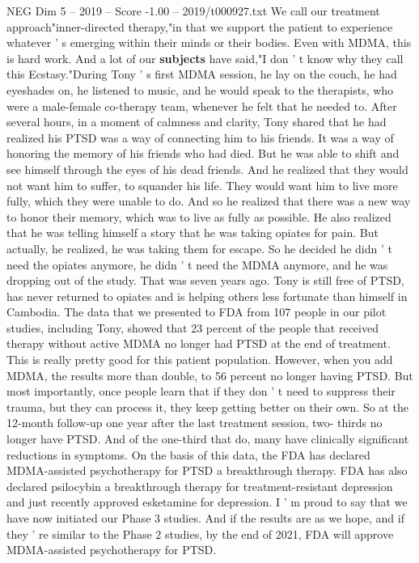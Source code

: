 \begin{textsample}{NEG Dim 5 – 2019 – Score -1.00 – 2019/t000927.txt}
We call our treatment approach"inner-directed therapy,"in that we support the patient to experience whatever ' s emerging within their minds or their bodies.
Even with MDMA, this is hard work.
And a lot of our \textbf{subjects} have said,"I don ' t know why they call this Ecstasy."During Tony ' s first MDMA session, he lay on the couch, he had eyeshades on, he listened to music, and he would speak to the therapists, who were a male-female co-therapy team, whenever he felt that he needed to.
After several hours, in a moment of calmness and clarity, Tony shared that he had realized his PTSD was a way of connecting him to his friends.
It was a way of honoring the memory of his friends who had died.
But he was able to shift and see himself through the eyes of his dead friends.
And he realized that they would not want him to suffer, to squander his life.
They would want him to live more fully, which they were unable to do.
And so he realized that there was a new way to honor their memory, which was to live as fully as possible.
He also realized that he was telling himself a story that he was taking opiates for pain.
But actually, he realized, he was taking them for escape.
So he decided he didn ' t need the opiates anymore, he didn ' t need the MDMA anymore, and he was dropping out of the study.
That was seven years ago.
Tony is still free of PTSD, has never returned to opiates and is helping others less fortunate than himself in Cambodia.
The data that we presented to FDA from 107 people in our pilot studies, including Tony, showed that 23 percent of the people that received therapy without active MDMA no longer had PTSD at the end of treatment.
This is really pretty good for this patient population.
However, when you add MDMA, the results more than double, to 56 percent no longer having PTSD.
But most importantly, once people learn that if they don ' t need to suppress their trauma, but they can process it, they keep getting better on their own.
So at the 12-month follow-up one year after the last treatment session, two- thirds no longer have PTSD.
And of the one-third that do, many have clinically significant reductions in symptoms.
On the basis of this data, the FDA has declared MDMA-assisted psychotherapy for PTSD a breakthrough therapy.
FDA has also declared psilocybin a breakthrough therapy for treatment-resistant depression and just recently approved esketamine for depression.
I ' m proud to say that we have now initiated our Phase 3 studies.
And if the results are as we hope, and if they ' re similar to the Phase 2 studies, by the end of 2021, FDA will approve MDMA-assisted psychotherapy for PTSD.

\end{textsample}

